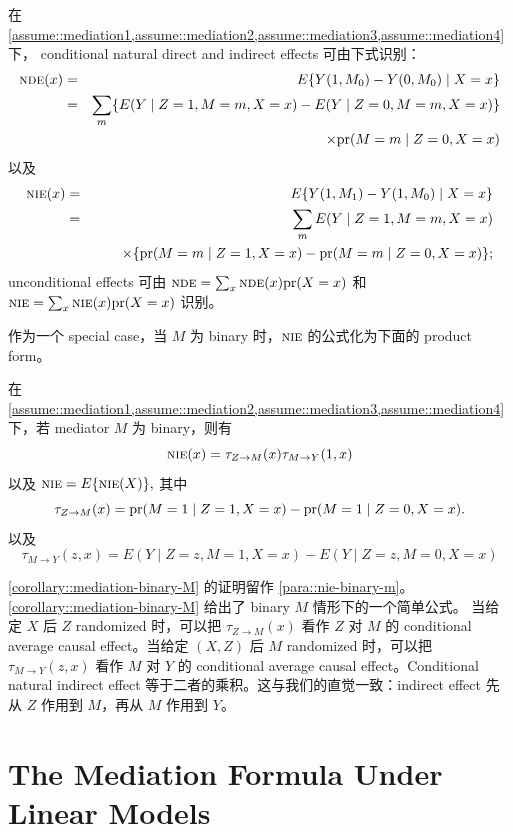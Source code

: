 \begin{corollary}
\label{corollary::mediation-nde-nie}
在 \cref{assume::mediation1,assume::mediation2,assume::mediation3,assume::mediation4} 下，
conditional natural direct and indirect effects 可由下式识别：
\begin{eqnarray*}
\textsc{nde}(x) &=& E\{ Y(1, M_0) - Y(0, M_0) \mid X=x \} \\
&=& \sum_m \{ E( Y  \mid  Z=1, M=m,   X=x) - E( Y  \mid  Z=0, M=m,   X=x) \} \\
&& \qquad  \times \textup{pr}(M=m \mid Z=0, X=x)
\end{eqnarray*}
以及
\begin{eqnarray*}
\textsc{nie}(x) &=& E\{ Y(1, M_1) - Y(1, M_0) \mid X=x \} \\
&=& \sum_m   E( Y  \mid  Z=1, M=m,   X=x)\\
&&  \qquad  \times  \{ \textup{pr}(M=m \mid Z=1, X=x) -  \textup{pr}(M=m \mid Z=0, X=x) \};
\end{eqnarray*}
unconditional effects 可由 $\textsc{nde}=\sum_x \textsc{nde}(x)\textup{pr}(X=x)$ 和 $\textsc{nie}=\sum_x \textsc{nie}(x)\textup{pr}(X=x)$ 识别。
\end{corollary}





作为一个 special case，当 $M$ 为 binary 时，$\textsc{nie}$ 的公式化为下面的 product form。


\begin{corollary}
\label{corollary::mediation-binary-M}
在 \cref{assume::mediation1,assume::mediation2,assume::mediation3,assume::mediation4} 下，若 mediator $M$ 为 binary，则有
$$
\textsc{nie}(x)  =      \tau_{Z\rightarrow M} (x) \tau_{M\rightarrow Y} (1,x)
$$
以及
$
\textsc{nie} = E\{  \textsc{nie}(X)   \},
$
其中
$$
\tau_{Z\rightarrow M}(x) =  \textup{pr}(M=1 \mid Z=1, X=x) -  \textup{pr}(M=1 \mid Z=0, X=x) . 
$$
以及
$$
\tau_{M\rightarrow Y} (z,x) = E( Y  \mid  Z=z, M=1,   X=x) - E( Y  \mid  Z=z, M=0,   X=x)
$$
\end{corollary}

\cref{corollary::mediation-binary-M} 的证明留作 \cref{para::nie-binary-m}。
\cref{corollary::mediation-binary-M} 给出了 binary $M$ 情形下的一个简单公式。
当给定 $X$ 后 $Z$ randomized 时，可以把 $\tau_{Z\rightarrow M}(x)$ 看作 $Z$ 对 $M$ 的 conditional average causal effect。当给定 $(X,Z)$ 后 $M$ randomized 时，可以把 $\tau_{M\rightarrow Y}(z,x)$ 看作 $M$ 对 $Y$ 的 conditional average causal effect。Conditional natural indirect effect 等于二者的乘积。这与我们的直觉一致：indirect effect 先从 $Z$ 作用到 $M$，再从 $M$ 作用到 $Y$。


\section{The Mediation Formula Under Linear Models}


